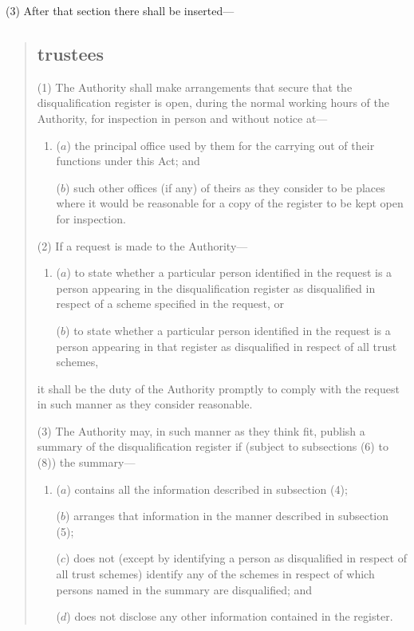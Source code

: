 \documentclass[12pt,a4paper]{article}
\begin{document}
(3) After that section there shall be inserted—
\begin{quotation}
\subsection*{\sloppy {} trustees}

(1) The Authority shall make arrangements that secure that the disqualification register is open, during the normal working hours of the Authority, for inspection in person and without notice at—
\begin{enumerate}\item[]
($a$) the principal office used by them for the carrying out of their functions under this Act; and

($b$) such other offices (if any) of theirs as they consider to be places where it would be reasonable for a copy of the register to be kept open for inspection.
\end{enumerate}

(2) If a request is made to the Authority—
\begin{enumerate}\item[]
($a$) to state whether a particular person identified in the request is a person appearing in the disqualification register as disqualified in respect of a scheme specified in the request, or

($b$) to state whether a particular person identified in the request is a person appearing in that register as disqualified in respect of all trust schemes,
\end{enumerate}
it shall be the duty of the Authority promptly to comply with the request in such manner as they consider reasonable.

(3) The Authority may, in such manner as they think fit, publish a summary of the disqualification register if (subject to subsections (6)  to (8)) the summary—
\begin{enumerate}\item[]
($a$) contains all the information described in subsection (4);

($b$) arranges that information in the manner described in subsection (5);

($c$) does not (except by identifying a person as disqualified in respect of all trust schemes) identify any of the schemes in respect of which persons named in the summary are disqualified; and

($d$) does not disclose any other information contained in the register.
\end{enumerate}


\end{quotation}
\end{document}
